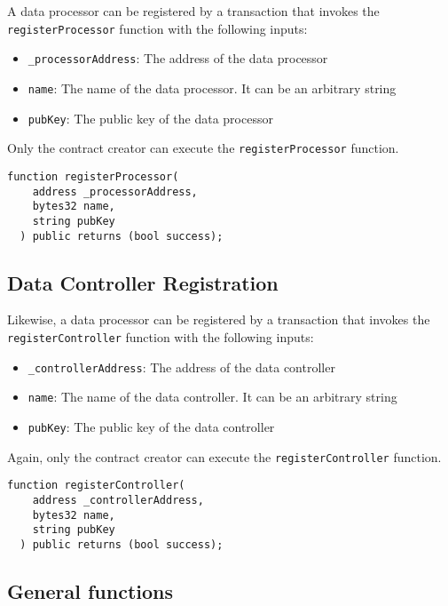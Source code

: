 A data processor can be registered by a transaction that invokes the \verb|registerProcessor| function with the following inputs:

\begin{itemize}
  \item \verb|_processorAddress|: The address of the data processor
  \item \verb|name|: The name of the data processor. It can be an arbitrary string
  \item \verb|pubKey|: The public key of the data processor
\end{itemize}

Only the contract creator can execute the \verb|registerProcessor| function.

\begin{lstlisting}[language=Solidity, caption={Data processor registration function}]
  function registerProcessor(
    address _processorAddress,
    bytes32 name,
    string pubKey
  ) public returns (bool success);
\end{lstlisting}

\subsection{Data Controller Registration}
\label{implemenation:contracts:reg_processor}

Likewise, a data processor can be registered by a transaction that invokes the \verb|registerController| function with the following inputs:

\begin{itemize}
  \item \verb|_controllerAddress|: The address of the data controller
  \item \verb|name|: The name of the data controller. It can be an arbitrary string
  \item \verb|pubKey|: The public key of the data controller
\end{itemize}

Again, only the contract creator can execute the \verb|registerController| function.

\begin{lstlisting}[language=Solidity, caption={Data controller registration function}]
  function registerController(
    address _controllerAddress,
    bytes32 name,
    string pubKey
  ) public returns (bool success);
\end{lstlisting}

\subsection{General functions}
\label{implemenation:contracts:general}

